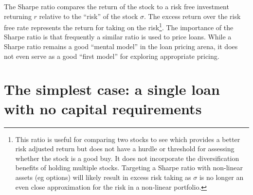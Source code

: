 \documentclass{article}
\begin{document}
The Sharpe ratio compares the return of the stock to a risk free investment returning \(r\) relative to the ``risk'' of the stock \(\sigma\).  The excess return over the risk free rate represents the return for taking on the risk\footnote{This ratio is useful for comparing two stocks to see which provides a better risk adjusted return but does not have a hurdle or threshold for assessing whether the stock is a good buy.  It does not incorporate the diversification benefits of holding multiple stocks.  Targeting a Sharpe ratio with non-linear assets (eg options) will likely result in excess risk taking as \(\sigma\) is no longer an even close approximation for the risk in a non-linear portfolio.}.  The importance of the Sharpe ratio is that frequently a similar ratio is used to price loans.  While a Sharpe ratio remains a good ``mental model'' in the loan pricing arena, it does not even serve as a good ``first model'' for exploring appropriate pricing.


\section{The simplest case: a single loan with no capital requirements}
\end{document}
